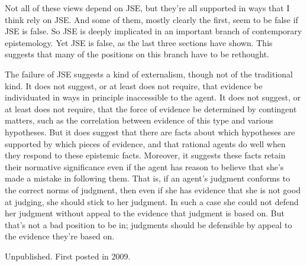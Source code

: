 \documentclass[
  10pt,
  letterpaper,
  DIV=11,
  numbers=noendperiod,
  twoside]{scrartcl}
\begin{document}
Not all of these views depend on JSE, but they're all supported in ways
that I think rely on JSE. And some of them, mostly clearly the first,
seem to be false if JSE is false. So JSE is deeply implicated in an
important branch of contemporary epistemology. Yet JSE is false, as the
last three sections have shown. This suggests that many of the positions
on this branch have to be rethought.

The failure of JSE suggests a kind of externalism, though not of the
traditional kind. It does not suggest, or at least does not require,
that evidence be individuated in ways in principle inaccessible to the
agent. It does not suggest, or at least does not require, that the force
of evidence be determined by contingent matters, such as the correlation
between evidence of this type and various hypotheses. But it does
suggest that there are facts about which hypotheses are supported by
which pieces of evidence, and that rational agents do well when they
respond to these epistemic facts. Moreover, it suggests these facts
retain their normative significance even if the agent has reason to
believe that she's made a mistake in following them. That is, if an
agent's judgment conforms to the correct norms of judgment, then even if
she has evidence that she is not good at judging, she should stick to
her judgment. In such a case she could not defend her judgment without
appeal to the evidence that judgment is based on. But that's not a bad
position to be in; judgments should be defensible by appeal to the
evidence they're based on.



\noindent Unpublished. First posted in 2009.
\end{document}
